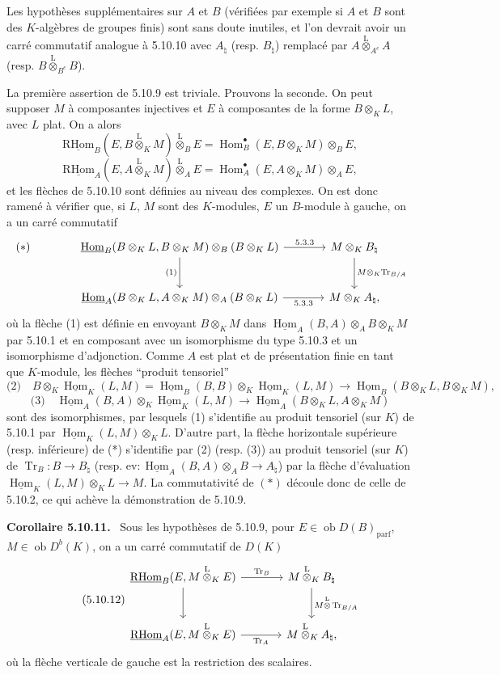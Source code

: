 \documentclass[11pt]{article}
\newenvironment{statement}[1]{\par\medskip\noindent\textbf{#1.}\ }{\par\medskip}
\DeclareMathOperator{\Hom}{Hom}
\newcommand{\R}{\mathrm{R}}\newcommand{\RHomCore}{\mathrm{RHom}}
\newcommand{\ob}{\operatorname{ob}}
\providecommand{\RHom}{\RHomCore}
\providecommand{\uRHom}{\underline{\RHom}}
\providecommand{\uHom}{\underline{\Hom}}
\providecommand{\Tr}{\operatorname{Tr}}
\providecommand{\Tr}{\operatorname{Tr}}
\providecommand{\lten}{\overset{\mathrm L}{\otimes}}
\providecommand{\Tr}{\operatorname{Tr}}
\providecommand{\RHom}{\RHomCore}
\providecommand{\Hom}{\operatorname{Hom}}
\providecommand{\ob}{\operatorname{ob}}
\providecommand{\lten}{\overset{\mathrm L}{\otimes}}
\providecommand{\RHom}{\R\mathcal{H}om}
\providecommand{\lten}{\overset{\mathrm L}{\otimes}}
\providecommand{\R}{\mathrm R}
\providecommand{\Tr}{\operatorname{Tr}}
\providecommand{\lten}{\overset{\mathrm L}{\otimes}}
\providecommand{\lten}{\overset{\mathrm L}{\otimes}}
\providecommand{\lten}{\overset{\mathrm L}{\otimes}}
\providecommand{\RHom}{\RHomCore}
\providecommand{\Hom}{\operatorname{Hom}}
\providecommand{\Tr}{\operatorname{Tr}}
\providecommand{\lten}{\overset{\mathrm L}{\otimes}}
\begin{document}
Les hypothèses supplémentaires sur $A$ et $B$ (vérifiées par exemple si $A$ et $B$ sont des $K$-algèbres de groupes finis) sont sans doute inutiles, et l'on devrait avoir un carré commutatif analogue à 5.10.10 avec $A_\natural$ (resp. $B_\natural$) remplacé par $A\lten_{A^e}A$ (resp. $B\lten_{B^e}B$).

La première assertion de 5.10.9 est triviale. Prouvons la seconde. On peut supposer $M$ à composantes injectives et $E$ à composantes de la forme $B\otimes_KL$, avec $L$ plat. On a alors
\[
\uRHom_B(E,B\lten_KM)\lten_BE=\Hom_B^\bullet(E,B\otimes_KM)\otimes_BE,
\]
\[
\uRHom_A(E,A\lten_KM)\lten_AE=\Hom_A^\bullet(E,A\otimes_KM)\otimes_AE,
\]
et les flèches de 5.10.10 sont définies au niveau des complexes. On est donc ramené à vérifier que, si $L$, $M$ sont des $K$-modules, $E$ un $B$-module à gauche, on a un carré commutatif
\[
\begin{tikzcd}[column sep=large,row sep=large]
|[alias=star]| {(*)} & \uHom_B(B\otimes_KL,B\otimes_KM)\otimes_B(B\otimes_KL) \arrow[r,"5.3.3"] \arrow[d,"(1)"'] & M\otimes_KB_\natural \arrow[d,"M\otimes_K\Tr_{B/A}"]\\
& \uHom_A(B\otimes_KL,A\otimes_KM)\otimes_A(B\otimes_KL) \arrow[r,"5.3.3"'] & M\otimes_KA_\natural,
\end{tikzcd}
\]
où la flèche (1) est définie en envoyant $B\otimes_KM$ dans $\uHom_A(B,A)\otimes_AB\otimes_KM$ par 5.10.1 et en composant avec un isomorphisme du type 5.10.3 et un isomorphisme d'adjonction. Comme $A$ est plat et de présentation finie en tant que $K$-module, les flèches ``produit tensoriel''
\[
\text{(2)}\quad B\otimes_K\uHom_K(L,M)=\uHom_B(B,B)\otimes_K\uHom_K(L,M)\to\uHom_B(B\otimes_KL,B\otimes_KM),
\]
\[
\text{(3)}\quad \uHom_A(B,A)\otimes_K\uHom_K(L,M)\to\uHom_A(B\otimes_KL,A\otimes_KM)
\]
sont des isomorphismes, par lesquels (1) s'identifie au produit tensoriel (sur $K$) de 5.10.1 par $\uHom_K(L,M)\otimes_KL$. D'autre part, la flèche horizontale supérieure (resp. inférieure) de (*) s'identifie par (2) (resp. (3)) au produit tensoriel (sur $K$) de $\Tr_B:B\to B_\natural$ (resp. $\mathrm{ev}:\uHom_A(B,A)\otimes_AB\to A_\natural$) par la flèche d'évaluation $\uHom_K(L,M)\otimes_KL\to M$. La commutativité de $(*)$ découle donc de celle de 5.10.2, ce qui achève la démonstration de 5.10.9.

\begin{statement}{Corollaire 5.10.11}
Sous les hypothèses de 5.10.9, pour $E\in\ob D(B)_{\mathrm{parf}}$, $M\in\ob D^b(K)$, on a un carré commutatif de $D(K)$
\begin{equation}\tag{5.10.12}
\begin{tikzcd}[column sep=large,row sep=large]
\uRHom_B(E,M\lten_KE) \arrow[r,"\Tr_B"] \arrow[d] & M\lten_KB_\natural \arrow[d,"M\lten\Tr_{B/A}"]\\
\uRHom_A(E,M\lten_KE) \arrow[r,"\Tr_A"'] & M\lten_KA_\natural,
\end{tikzcd}
\end{equation}
où la flèche verticale de gauche est la restriction des scalaires.
\end{statement}
\end{document}
